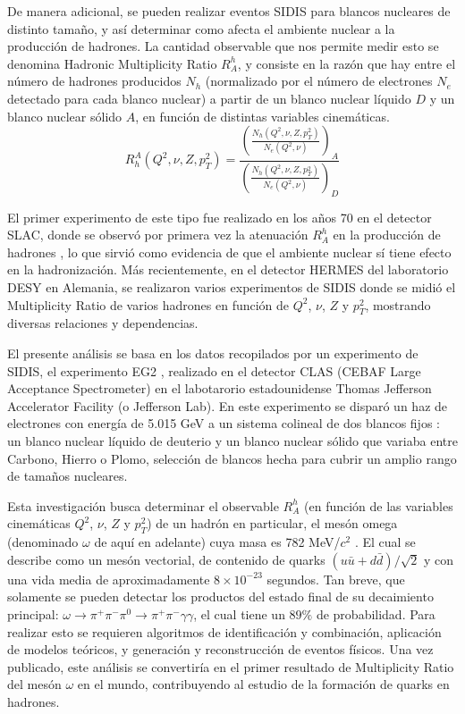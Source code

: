 De manera adicional, se pueden realizar eventos SIDIS para blancos nucleares de distinto tamaño, y así determinar como afecta el ambiente nuclear a la producción de hadrones. La cantidad observable que nos permite medir esto se denomina Hadronic Multiplicity Ratio $R^h_A$, y consiste en la razón que hay entre el número de hadrones producidos $N_h$ (normalizado por el número de electrones $N_e$ detectado para cada blanco nuclear) a partir de un blanco nuclear líquido $D$ y un blanco nuclear sólido $A$, en función de distintas variables cinemáticas.
\begin{equation*}
    R_h^A (Q^2, \nu, Z, p_T^2) = \frac{\left( \frac{N_h(Q^2, \nu, Z, p_T^2)}{N_e(Q^2, \nu)} \right)_A}{\left( \frac{N_h(Q^2, \nu, Z, p_T^2)}{N_e(Q^2, \nu)} \right)_D}
\end{equation*}

El primer experimento de este tipo fue realizado en los años 70 en el detector SLAC, donde se observó por primera vez la atenuación $R^h_A$ en la producción de hadrones \cite{slac}, lo que sirvió como evidencia de que el ambiente nuclear sí tiene efecto en la hadronización. Más recientemente, en el detector HERMES del laboratorio DESY en Alemania, se realizaron varios experimentos de SIDIS donde se midió el Multiplicity Ratio de varios hadrones en función de $Q^2$, $\nu$, $Z$ y $p_T^2$, mostrando diversas relaciones y dependencias. \cite{hermes1, hermes2}

El presente análisis se basa en los datos recopilados por un experimento de SIDIS, el experimento EG2 \cite{eg2}, realizado en el detector CLAS (CEBAF Large Acceptance Spectrometer) \cite{clas} en el labotarorio estadounidense Thomas Jefferson Accelerator Facility (o Jefferson Lab). En este experimento se disparó un haz de electrones con energía de 5.015 GeV a un sistema colineal de dos blancos fijos \cite{target}: un blanco nuclear líquido de deuterio y un blanco nuclear sólido que variaba entre Carbono, Hierro o Plomo, selección de blancos hecha para cubrir un amplio rango de tamaños nucleares.

Esta investigación busca determinar el observable $R^h_A$ (en función de las variables cinemáticas $Q^2$, $\nu$, $Z$ y $p_T^2$) de un hadrón en particular, el mesón omega (denominado $\omega$ de aquí en adelante) cuya masa es 782 MeV/$c^2$ \cite{pdg}. El cual se describe como un mesón vectorial, de contenido de quarks $(u \bar{u} + d  \bar{d})/\sqrt{2}$ y con una vida media de aproximadamente $8 \times 10^{-23}$ segundos. Tan breve, que solamente se pueden detectar los productos del estado final de su decaimiento principal: $\omega \rightarrow \pi^+ \pi^{-} \pi^0 \rightarrow  \pi^+ \pi^{-} \gamma \gamma$, el cual tiene un $89\%$ de probabilidad. Para realizar esto se requieren algoritmos de identificación y combinación, aplicación de modelos teóricos, y generación y reconstrucción de eventos físicos. Una vez publicado, este análisis se convertiría en el primer resultado de Multiplicity Ratio del mesón $\omega$ en el mundo, contribuyendo al estudio de la formación de quarks en hadrones.

